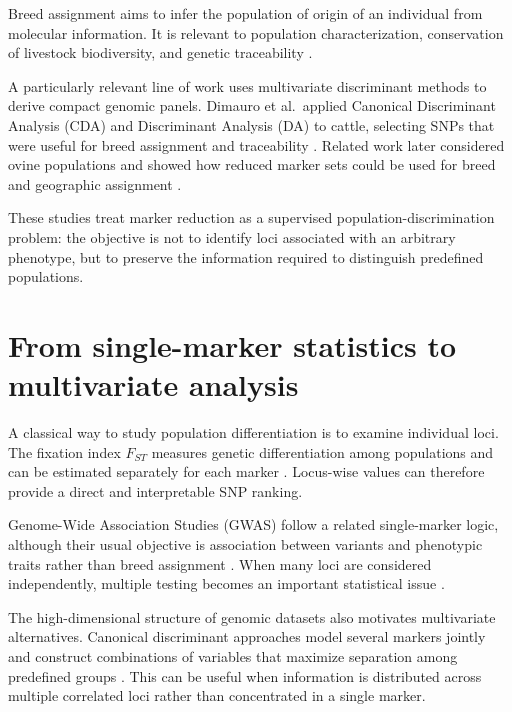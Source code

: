 Breed assignment aims to infer the population of origin of an
individual from molecular information. It is relevant to population
characterization, conservation of livestock biodiversity, and genetic
traceability \cite{groeneveld2010diversity, dalvit2007traceability}.

A particularly relevant line of work uses multivariate discriminant
methods to derive compact genomic panels. Dimauro et al.\ applied
Canonical Discriminant Analysis (CDA) and Discriminant Analysis (DA)
to cattle, selecting SNPs that were useful for breed assignment and
traceability \cite{dimauro2013canonical}. Related work later
considered ovine populations and showed how reduced marker sets could
be used for breed and geographic assignment
\cite{dimauro2015sheep}.

These studies treat marker reduction as a supervised
population-discrimination problem: the objective is not to identify
loci associated with an arbitrary phenotype, but to preserve the
information required to distinguish predefined populations.

\section{From single-marker statistics to multivariate analysis}
\label{sec:classical_marker_discovery}

A classical way to study population differentiation is to examine
individual loci. The fixation index $F_{ST}$ measures genetic
differentiation among populations and can be estimated separately for
each marker \cite{wright1949genetical, weir1984estimating}.
Locus-wise values can therefore provide a direct and interpretable SNP
ranking.

Genome-Wide Association Studies (GWAS) follow a related single-marker
logic, although their usual objective is association between variants
and phenotypic traits rather than breed assignment
\cite{hirschhorn2005genome}. When many loci are considered
independently, multiple testing becomes an important statistical issue
\cite{storey2003significance}.

The high-dimensional structure of genomic datasets also motivates
multivariate alternatives. Canonical discriminant approaches model
several markers jointly and construct combinations of variables that
maximize separation among predefined groups
\cite{sorbolini2016signatures}. This can be useful when information is
distributed across multiple correlated loci rather than concentrated
in a single marker.


